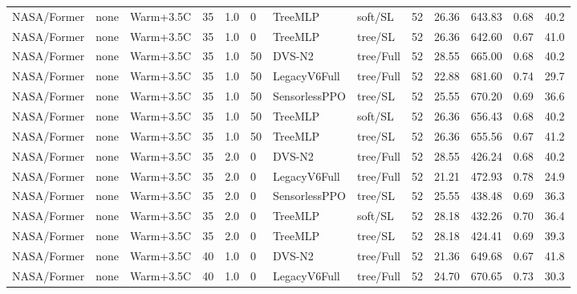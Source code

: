 \documentclass[10pt,a4paper]{article}
\begin{document}
\begin{landscape}
\begin{longtable}{llllllllrrrrr}
NASA/Former & none & Warm+3.5C & 35 & 1.0 & 0 & TreeMLP & soft/SL & 52 & 26.36 & 643.83 & 0.68 & 40.2 \\

NASA/Former & none & Warm+3.5C & 35 & 1.0 & 0 & TreeMLP & tree/SL & 52 & 26.36 & 642.60 & 0.67 & 41.0 \\

NASA/Former & none & Warm+3.5C & 35 & 1.0 & 50 & DVS-N2 & tree/Full & 52 & 28.55 & 665.00 & 0.68 & 40.2 \\

NASA/Former & none & Warm+3.5C & 35 & 1.0 & 50 & LegacyV6Full & tree/Full & 52 & 22.88 & 681.60 & 0.74 & 29.7 \\

NASA/Former & none & Warm+3.5C & 35 & 1.0 & 50 & SensorlessPPO & tree/SL & 52 & 25.55 & 670.20 & 0.69 & 36.6 \\

NASA/Former & none & Warm+3.5C & 35 & 1.0 & 50 & TreeMLP & soft/SL & 52 & 26.36 & 656.43 & 0.68 & 40.2 \\

NASA/Former & none & Warm+3.5C & 35 & 1.0 & 50 & TreeMLP & tree/SL & 52 & 26.36 & 655.56 & 0.67 & 41.2 \\

NASA/Former & none & Warm+3.5C & 35 & 2.0 & 0 & DVS-N2 & tree/Full & 52 & 28.55 & 426.24 & 0.68 & 40.2 \\

NASA/Former & none & Warm+3.5C & 35 & 2.0 & 0 & LegacyV6Full & tree/Full & 52 & 21.21 & 472.93 & 0.78 & 24.9 \\

NASA/Former & none & Warm+3.5C & 35 & 2.0 & 0 & SensorlessPPO & tree/SL & 52 & 25.55 & 438.48 & 0.69 & 36.3 \\

NASA/Former & none & Warm+3.5C & 35 & 2.0 & 0 & TreeMLP & soft/SL & 52 & 28.18 & 432.26 & 0.70 & 36.4 \\

NASA/Former & none & Warm+3.5C & 35 & 2.0 & 0 & TreeMLP & tree/SL & 52 & 28.18 & 424.41 & 0.69 & 39.3 \\

NASA/Former & none & Warm+3.5C & 40 & 1.0 & 0 & DVS-N2 & tree/Full & 52 & 21.36 & 649.68 & 0.67 & 41.8 \\

NASA/Former & none & Warm+3.5C & 40 & 1.0 & 0 & LegacyV6Full & tree/Full & 52 & 24.70 & 670.65 & 0.73 & 30.3 \\


\end{longtable}
\end{landscape}
\end{document}
